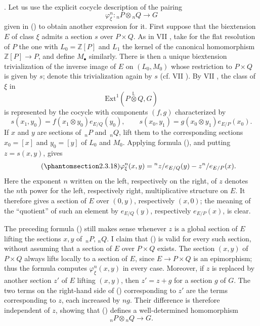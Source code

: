 
\medskip
\noindent {}.  Let us use the explicit cocycle description of the
pairing
\[
 \varphi_\xi^n:{}_nP\otimes{}_nQ\longrightarrow G
\]
given in () to obtain another expression for it.  First suppose
that the biextension $E$ of class $\xi$ admits a section $s$ over
$P\times Q$.  As in VII , take for the flat resolution of $P$
the one with $L_0=\mathbb Z[P]$ and $L_1$ the kernel of the canonical
homomorphism $\mathbb Z[P]\longrightarrow P$, and define
$M_\bullet$ similarly.  There is then a unique biextension
trivialization of the inverse image of $E$ on $(L_0,M_0)$ whose
restriction to $P\times Q$ is given by $s$; denote this trivialization
again by $s$ (cf. VII ).  By VII , the class of $\xi$ in
\[
 \mathrm{Ext}^1\!\left(
 P\mathbin{\overset{\mathbb L}{\otimes}}Q,G\right)
\]
is represented by the cocycle with components $(f,g)$ characterized by
\[
 s(x_1,y_0)=f(x_1\otimes y_0)e_{E/Q}(y_0),
 \qquad
 s(x_0,y_1)=g(x_0\otimes y_1)e_{E/P}(x_0).
\]
If $x$ and $y$ are sections of $\,{}_nP$ and $\,{}_nQ$, lift them to
the corresponding sections $x_0=[x]$ and $y_0=[y]$ of $L_0$ and
$M_0$.  Applying formula (), and putting $z=s(x,y)$, gives
\begin{equation}\tag{\SGARefTarget{sga7.sga7i.eviii.n2-3-18}{2.3.18}}
 \varphi_\xi^n(x,y)
 ={}^n z/e_{E/Q}(y)-z^n/e_{E/P}(x).
\end{equation}
Here the exponent $n$ written on the left, respectively on the right,
of $z$ denotes the $n$th power for the left, respectively right,
multiplicative structure on $E$.  It therefore gives a section of $E$
over $(0,y)$, respectively $(x,0)$; the meaning of the ``quotient'' of
such an element by $e_{E/Q}(y)$, respectively $e_{E/P}(x)$, is clear.

The preceding formula () still makes sense whenever $z$ is a
global section of $E$ lifting the sections $x,y$ of
$\,{}_nP,\,{}_nQ$.  I claim that () is valid for every such
section, without assuming that a section of $E$ over $P\times Q$
exists.  The section $(x,y)$ of $P\times Q$ always lifts locally to a
section of $E$, since $E\longrightarrow P\times Q$ is an epimorphism;
thus the formula computes $\varphi_\xi^n(x,y)$ in every case.
Moreover, if $z$ is replaced by another section $z'$ of $E$ lifting
$(x,y)$, then $z'=z+g$ for a section $g$ of $G$.  The two terms on the
right-hand side of () corresponding to $z'$ are the terms
corresponding to $z$, each increased by $ng$.  Their difference is
therefore independent of $z$, showing that () defines a
well-determined homomorphism
\[
 {}_nP\otimes{}_nQ\longrightarrow G.
\]

